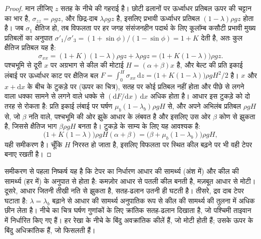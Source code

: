 \begin{proof}
मान लीजिए $z$ सतह के नीचे की गहराई है। छोटी ढलानों पर ऊर्ध्वाधर प्रतिबल ऊपर की चट्टान का भार है,
$\sigma_{zz} = \rho g z$, और छिद्र-दाब
$\lambda\rho g z$ है, इसलिए प्रभावी ऊर्ध्वाधर प्रतिबल
$(1 - \lambda)\rho g z$ होता है। जब $\sigma_1$ क्षैतिज हो, तब विफलता पर हर जगह
संसंजनहीन पदार्थ के लिए कूलॉम्ब कसौटी प्रभावी मुख्य प्रतिबलों का अनुपात
$\sigma'_1/\sigma'_3 = (1 + \sin\phi)/(1 -
\sin\phi) = 1 + K$ देती है, अतः कुल क्षैतिज प्रतिबल यह है:
\[
  \sigma_{xx} = (1 + K)(1 - \lambda)\rho g z + \lambda\rho g z
  = \bigl(1 + K(1 - \lambda)\bigr)\rho g z .
\]
पश्चभूमि से दूरी $x$ पर अग्रभाग से कील की मोटाई $H = (\alpha +
\beta)x$ है, और बेल्ट की प्रति इकाई लंबाई पर ऊर्ध्वाधर काट पर क्षैतिज बल
$F = \int_0^H \sigma_{xx}\,\mathrm dz = \bigl(1 + K(1 -
\lambda)\bigr)\rho g H^2/2$ है। $x$ और $x + \mathrm dx$ के बीच के टुकड़े पर
(ऊपर का चित्र), सतह पर कोई प्रतिबल नहीं होता और पीछे से लगने वाला धक्का
सामने से लगने वाले धक्के से $(\mathrm dF/\mathrm dx)\,\mathrm dx$ अधिक होता है।
आधार इस टुकड़े को दो तरह से रोकता है: प्रति इकाई लंबाई पर घर्षण $\mu_b(1 -
\lambda_b)\rho g H$ से, और अपने अभिलंब प्रतिबल $\rho g H$ से, जो
$\beta$ नति वाले, पश्चभूमि की ओर झुके आधार के लंबवत है और इसलिए
उस ओर $\beta$ कोण से झुकता है, जिससे क्षैतिज भाग $\beta\rho g H$ बनता है।
टुकड़े के साम्य के लिए यह आवश्यक है:
\[
  \bigl(1 + K(1 - \lambda)\bigr)\rho g H(\alpha + \beta)
  = \bigl(\beta + \mu_b(1 - \lambda_b)\bigr)\rho g H ,
\]
यही समीकरण है। चूँकि $H$ निरस्त हो जाता है, इसलिए विफलता पर स्थित कील
बढ़ने पर भी वही टेपर बनाए रखती है।
\end{proof}

समीकरण से पहला निष्कर्ष यह है कि टेपर का निर्धारण आधार की सामर्थ्य
(अंश में) और कील की सामर्थ्य (हर में) के अनुपात से होता है:
कमज़ोर आधार से पतली कील बनती है, मज़बूत आधार से मोटी।
दूसरे, आधार जितनी तीखी नति से झुकता है, सतह-ढलान उतनी ही घटती है। तीसरे, द्रव दाब
टेपर घटाता है: $\lambda = \lambda_b$ बढ़ाने से आधार की सामर्थ्य
अनुपातिक रूप से कील की सामर्थ्य की तुलना में अधिक छीन लेता है।
नीचे का चित्र घर्षण गुणांकों के लिए क्रांतिक सतह-ढलान दिखाता है,
जो पश्चिमी ताइवान में निर्धारित किए गए हैं। हर रेखा के नीचे के बिंदु अवक्रांतिक कीलें हैं,
जो मोटी होती हैं; उसके ऊपर के बिंदु अधिक्रांतिक हैं, जो फिसलती हैं।

